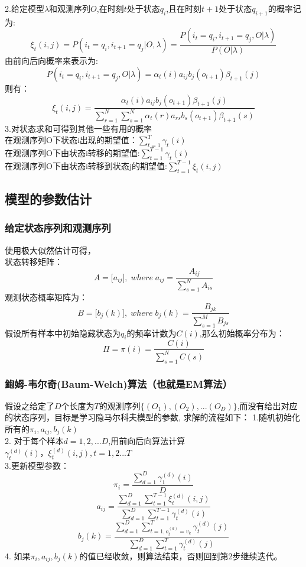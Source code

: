 \documentclass[UTF8]{article}%
\begin{document}
	2.给定模型$\lambda$和观测序列$O$,在时刻$t$处于状态$q_i$,且在时刻$t+1$处于状态$q_{i+1}$的概率记为:$$\xi_t(i,j) = P(i_t = q_i, i_{t+1}=q_j | O,\lambda) = \frac{ P(i_t = q_i, i_{t+1}=q_j , O|\lambda)}{P(O|\lambda)}$$
	由前向后向概率来表示为:$$P(i_t = q_i, i_{t+1}=q_j , O|\lambda) = \alpha_t(i)a_{ij}b_j(o_{t+1})\beta_{t+1}(j)$$
	则有：$$\xi_t(i,j) = \frac{\alpha_t(i)a_{ij}b_j(o_{t+1})\beta_{t+1}(j)}{\sum\limits_{r=1}^N\sum\limits_{s=1}^N\alpha_t(r)a_{rs}b_s(o_{t+1})\beta_{t+1}(s)}$$
	3.对状态求和可得到其他一些有用的概率
	\\在观测序列O下状态i出现的期望值：$\sum\limits_{t=1}^T\gamma_t(i)$
	\\在观测序列O下由状态i转移的期望值:$\sum\limits_{t=1}^{T-1}\gamma_t(i)$
	\\在观测序列O下由状态i转移到状态j的期望值:$\sum\limits_{t=1}^{T-1}\xi_t(i,j)$
	
	\subsection{模型的参数估计}
	\subsubsection{给定状态序列和观测序列}
	使用极大似然估计可得，
	\\状态转移矩阵：$$A = \Big[a_{ij}\Big], \;where\; a_{ij} = \frac{A_{ij}}{\sum\limits_{s=1}^{N}A_{is}}$$
	观测状态概率矩阵为：$$B= \Big[b_{j}(k)\Big], \;{where}\; b_{j}(k) = \frac{B_{jk}}{\sum\limits_{s=1}^{M}B_{js}}$$
	假设所有样本中初始隐藏状态为$q_i$的频率计数为$C(i)$,那么初始概率分布为：
	$$\Pi = \pi(i) = \frac{C(i)}{\sum\limits_{s=1}^{N}C(s)}$$
	\newpage
	\subsubsection{鲍姆-韦尔奇(Baum-Welch)算法（也就是EM算法）}
	假设之给定了$D$个长度为$T$的观测序列$\{(O_1), (O_2), ...(O_D)\}$,而没有给出对应的状态序列，目标是学习隐马尔科夫模型的参数,
	求解的流程如下：
	1.随机初始化所有的$\pi_i, a_{ij},b_{j}(k)$ \\
	2. 对于每个样本$d = 1,2,...D$,用前向后向算法计算$\gamma_t^{(d)}(i)，\xi_t^{(d)}(i,j), t =1,2...T$\\
	3.更新模型参数：
	$$\pi_i =  \frac{\sum\limits_{d=1}^D\gamma_1^{(d)}(i)}{D}$$
	$$a_{ij} = \frac{\sum\limits_{d=1}^D\sum\limits_{t=1}^{T-1}\xi_t^{(d)}(i,j)}{\sum\limits_{d=1}^D\sum\limits_{t=1}^{T-1}\gamma_t^{(d)}(i)}$$
	$$b_{j}(k) = \frac{\sum\limits_{d=1}^D\sum\limits_{t=1, o_t^{(d)}=v_k}^{T}\gamma_t^{(d)}(j)}{\sum\limits_{d=1}^D\sum\limits_{t=1}^{T}\gamma_t^{(d)}(j)}$$
	4. 如果$\pi_i, a_{ij},b_{j}(k)$的值已经收敛，则算法结束，否则回到第2步继续迭代。
	
\end{document}
